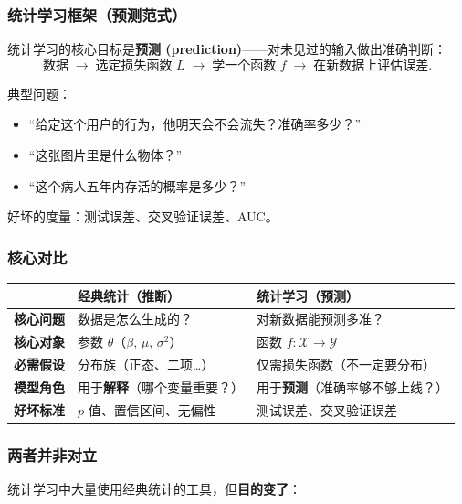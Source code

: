 \subsubsection{统计学习框架（预测范式）}

统计学习的核心目标是\textbf{预测 (prediction)}——对未见过的输入做出准确判断：
\[
\text{数据} \;\longrightarrow\; \text{选定损失函数 } L
\;\longrightarrow\; \text{学一个函数 } f \;\longrightarrow\; \text{在新数据上评估误差}.
\]

典型问题：
\begin{itemize}
    \item ``给定这个用户的行为，他明天会不会流失？准确率多少？''
    \item ``这张图片里是什么物体？''
    \item ``这个病人五年内存活的概率是多少？''
\end{itemize}
好坏的度量：测试误差、交叉验证误差、AUC。

\subsubsection{核心对比}

\begin{center}
\renewcommand{\arraystretch}{1.6}
\begin{tabular}{p{3cm}|p{5.5cm}|p{5.5cm}}
\toprule
& \textbf{经典统计（推断）} & \textbf{统计学习（预测）} \\
\midrule
\textbf{核心问题} & 数据是怎么生成的？ & 对新数据能预测多准？ \\
\textbf{核心对象} & 参数 $\theta$（$\beta$, $\mu$, $\sigma^2$） & 函数 $f: \mathcal{X} \to \mathcal{Y}$ \\
\textbf{必需假设} & 分布族（正态、二项…） & 仅需损失函数（不一定要分布） \\
\textbf{模型角色} & 用于\textbf{解释}（哪个变量重要？） & 用于\textbf{预测}（准确率够不够上线？） \\
\textbf{好坏标准} & $p$ 值、置信区间、无偏性 & 测试误差、交叉验证误差 \\
\bottomrule
\end{tabular}
\end{center}

\subsubsection{两者并非对立}

统计学习中大量使用经典统计的工具，但\textbf{目的变了}：

